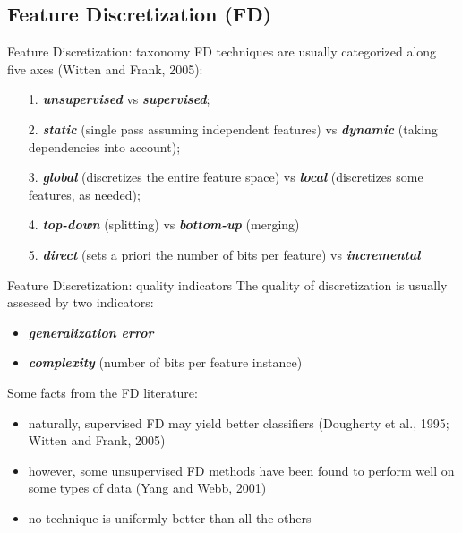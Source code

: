 \documentclass{beamer}
\begin{document}
\subsection[{Feature Discretization}]{Feature Discretization (FD)}
\begin{frame}{Feature Discretization: taxonomy}
FD techniques are usually categorized along five axes (Witten and Frank, 2005):
\begin{itemize}
	\vfill
	\item[1.] \textbf{\emph{unsupervised}} vs \textbf{\emph{supervised}};
	
	\vfill
	\item[2.] \textbf{\emph{static}} (single pass assuming independent features) vs
	\textbf{\emph{dynamic}} (taking dependencies into account);
	
	\vfill
	\item[3.] \textbf{\emph{global}} (discretizes the entire feature space)
	vs \textbf{\emph{local}} (discretizes some features, as needed);
	
	\vfill
	\item[4.] \textbf{\emph{top-down}} (splitting) vs \textbf{\emph{bottom-up}} (merging)
	
	\vfill
	\item[5.] \textbf{\emph{direct}} (sets a priori the number of bits per
feature) vs \textbf{\emph{incremental}}
\end{itemize}
\end{frame}


\begin{frame}{Feature Discretization: quality indicators}
The quality of discretization is usually assessed by
two indicators:
\begin{itemize}
	\item \textbf{\emph{generalization error}}
	\item \textbf{\emph{complexity}} (number of bits per feature instance)
\end{itemize}

\vfill
Some facts from the FD literature:
\begin{itemize}
	\item naturally, supervised FD may yield  better classifiers (Dougherty et al., 1995;
Witten and Frank, 2005)
	\item however, some unsupervised FD methods have been found to
perform well on some types of data (Yang and Webb, 2001)
	\item no technique is uniformly better than all the others
\end{itemize}
\end{frame}
\end{document}
